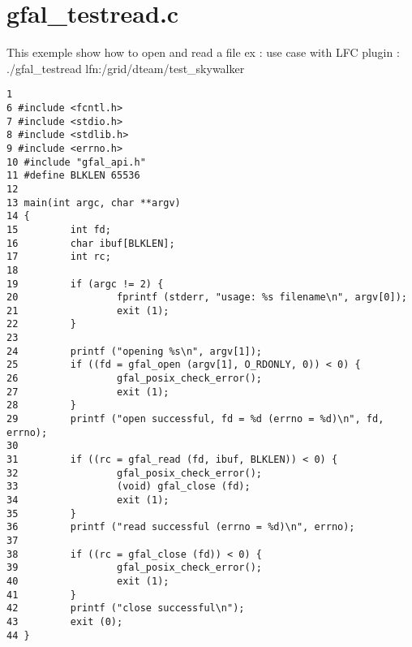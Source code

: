 \section{gfal\_\-testread.c}
This exemple show how to open and read a file ex : use case with LFC plugin : ./gfal\_\-testread lfn:/grid/dteam/test\_\-skywalker



\begin{DocInclude}\begin{verbatim}1 
6 #include <fcntl.h>
7 #include <stdio.h>
8 #include <stdlib.h>
9 #include <errno.h>
10 #include "gfal_api.h"
11 #define BLKLEN 65536
12 
13 main(int argc, char **argv)
14 {
15         int fd;
16         char ibuf[BLKLEN];
17         int rc;
18 
19         if (argc != 2) {
20                 fprintf (stderr, "usage: %s filename\n", argv[0]);
21                 exit (1);
22         }
23 
24         printf ("opening %s\n", argv[1]);
25         if ((fd = gfal_open (argv[1], O_RDONLY, 0)) < 0) {
26                 gfal_posix_check_error();
27                 exit (1);
28         }
29         printf ("open successful, fd = %d (errno = %d)\n", fd, errno);
30 
31         if ((rc = gfal_read (fd, ibuf, BLKLEN)) < 0) {
32                 gfal_posix_check_error();
33                 (void) gfal_close (fd);
34                 exit (1);
35         }
36         printf ("read successful (errno = %d)\n", errno);
37 
38         if ((rc = gfal_close (fd)) < 0) {
39                 gfal_posix_check_error();
40                 exit (1);
41         }
42         printf ("close successful\n");
43         exit (0);
44 }
\end{verbatim}
\end{DocInclude}
 